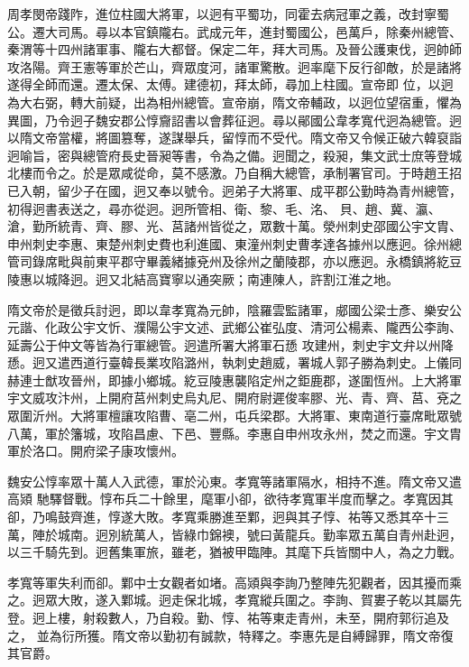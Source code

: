 \begin{pinyinscope}
 周孝閔帝踐阼，進位柱國大將軍，以迥有平蜀功，同霍去病冠軍之義，改封寧蜀公。遷大司馬。尋以本官鎮隴右。武成元年，進封蜀國公，邑萬戶，除秦州總管、秦渭等十四州諸軍事、隴右大都督。保定二年，拜大司馬。及晉公護東伐，迥帥師攻洛陽。齊王憲等軍於芒山，齊眾度河，諸軍驚散。迥率麾下反行卻敵，於是諸將遂得全師而還。遷太保、太傅。建德初，拜太師，尋加上柱國。宣帝即
 位，以迥為大右弼，轉大前疑，出為相州總管。宣帝崩，隋文帝輔政，以迥位望宿重，懼為異圖，乃令迥子魏安郡公惇齎詔書以會葬征迥。尋以鄖國公韋孝寬代迥為總管。迥以隋文帝當權，將圖篡奪，遂謀舉兵，留惇而不受代。隋文帝又令候正破六韓裒詣迥喻旨，密與總管府長史晉昶等書，令為之備。迥聞之，殺昶，集文武士庶等登城北樓而令之。於是眾咸從命，莫不感激。乃自稱大總管，承制署官司。于時趙王招已入朝，留少子在國，迥又奉以號令。迥弟子大將軍、成平郡公勤時為青州總管，初得迥書表送之，尋亦從迥。迥所管相、衛、黎、毛、洺、
 貝、趙、冀、瀛、滄，勤所統青、齊、膠、光、莒諸州皆從之，眾數十萬。滎州刺史邵國公宇文胄、申州刺史李惠、東楚州刺史費也利進國、東潼州刺史曹孝達各據州以應迥。徐州總管司錄席毗與前東平郡守畢義緒據兗州及徐州之蘭陵郡，亦以應迥。永橋鎮將紇豆陵惠以城降迥。迥又北結高寶寧以通突厥；南連陳人，許割江淮之地。



 隋文帝於是徵兵討迥，即以韋孝寬為元帥，陰羅雲監諸軍，郕國公梁士彥、樂安公元諧、化政公宇文忻、濮陽公宇文述、武鄉公崔弘度、清河公楊素、隴西公李詢、延壽公于仲文等皆為行軍總管。迥遣所署大將軍石愻
 攻建州，刺史宇文弁以州降愻。迥又遣西道行臺韓長業攻陷潞州，執刺史趙威，署城人郭子勝為刺史。上儀同赫連士猷攻晉州，即據小鄉城。紇豆陵惠襲陷定州之鉅鹿郡，遂圍恆州。上大將軍宇文威攻汴州，上開府莒州刺史烏丸尼、開府尉遲俊率膠、光、青、齊、莒、兗之眾圍沂州。大將軍檀讓攻陷曹、亳二州，屯兵梁郡。大將軍、東南道行臺席毗眾號八萬，軍於籓城，攻陷昌慮、下邑、豐縣。李惠自申州攻永州，焚之而還。宇文胄軍於洛口。開府梁子康攻懷州。



 魏安公惇率眾十萬人入武德，軍於沁東。孝寬等諸軍隔水，相持不進。隋文帝又遣高熲
 馳驛督戰。惇布兵二十餘里，麾軍小卻，欲待孝寬軍半度而擊之。孝寬因其卻，乃鳴鼓齊進，惇遂大敗。孝寬乘勝進至鄴，迥與其子惇、祐等又悉其卒十三萬，陣於城南。迥別統萬人，皆綠巾錦襖，號曰黃龍兵。勤率眾五萬自青州赴迥，以三千騎先到。迥舊集軍旅，雖老，猶被甲臨陣。其麾下兵皆關中人，為之力戰。



 孝寬等軍失利而卻。鄴中士女觀者如堵。高熲與李詢乃整陣先犯觀者，因其擾而乘之。迥眾大敗，遂入鄴城。迥走保北城，孝寬縱兵圍之。李詢、賀婁子乾以其屬先登。迥上樓，射殺數人，乃自殺。勤、惇、祐等東走青州，未至，開府郭衍追及之，
 並為衍所獲。隋文帝以勤初有誠款，特釋之。李惠先是自縛歸罪，隋文帝復其官爵。




\end{pinyinscope}
